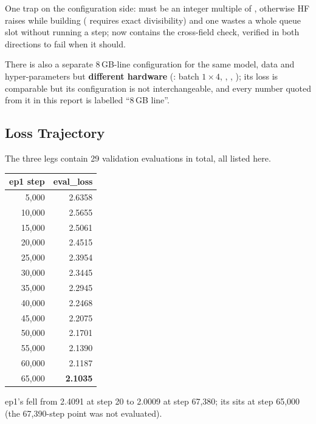 One trap on the configuration side:  must be an integer multiple of
, otherwise HF raises  while building 
( requires exact divisibility) and one wastes a whole queue
slot without running a step;  now contains the cross-field
check, verified in both directions to fail when it should.

There is also a separate 8\,GB-line configuration for the same model, data and hyper-parameters
but \textbf{different hardware} (: batch $1\times4$,
, , ); its loss is
comparable but its configuration is not interchangeable, and every number quoted from it in this
report is labelled ``8\,GB line''.

\subsection{Loss Trajectory}

The three legs contain 29 validation evaluations in total, all listed here.

\begin{center}\small
\begin{tabular}{@{}rr@{}}
\toprule
\textbf{ep1 step} & \textbf{eval\_loss} \\
\midrule
5{,}000 & 2.6358 \\
10{,}000 & 2.5655 \\
15{,}000 & 2.5061 \\
20{,}000 & 2.4515 \\
25{,}000 & 2.3954 \\
30{,}000 & 2.3445 \\
35{,}000 & 2.2945 \\
40{,}000 & 2.2468 \\
45{,}000 & 2.2075 \\
50{,}000 & 2.1701 \\
55{,}000 & 2.1390 \\
60{,}000 & 2.1187 \\
65{,}000 & \textbf{2.1035} \\
\bottomrule
\end{tabular}
\end{center}

ep1's  fell from 2.4091 at step 20 to 2.0009 at step 67{,}380; its
 sits at step 65{,}000 (the 67{,}390-step point was not evaluated).

